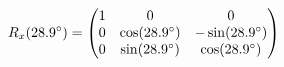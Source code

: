 \documentclass[preview]{standalone}
\begin{document}
\begin{align*}
\special{dvisvgm:raw <g id='unique000'>}R_x(28.9^\circ) = \begin{pmatrix} 1 & 0 & 0 \\ 0 & \cos(28.9^\circ) & -\sin(28.9^\circ) \\ 0 & \sin(28.9^\circ) & \cos(28.9^\circ) \end{pmatrix}\special{dvisvgm:raw </g>}
\end{align*}
\end{document}
